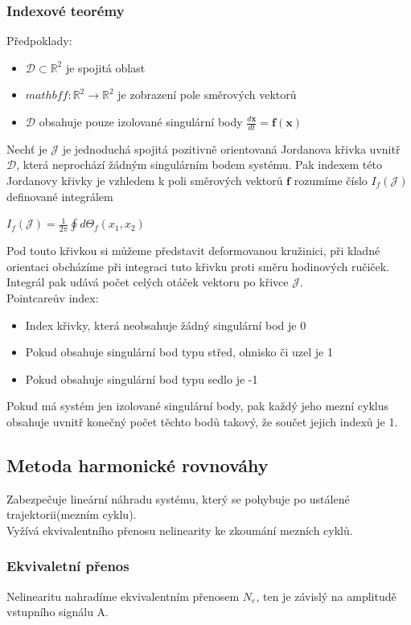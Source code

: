 \subsubsection*{Indexové teorémy}
Předpoklady:
\begin{itemize}
    \item \(\mathcal{D} \subset \mathbb{R}^2 \) je spojitá oblast
    \item \(mathbf{f}: \mathbb{R}^2 \rightarrow \mathbb{R}^2\) je zobrazení pole směrových vektorů
    \item \(\mathcal{D}\) obsahuje pouze izolované singulární body \(\frac{d\mathbf{x}}{dt} = \mathbf{f}(\mathbf{x})\)
\end{itemize}
Nechť je \(\mathcal{J}\) je jednoduchá spojitá pozitivně orientovaná Jordanova křivka uvnitř \(\mathcal{D}\), která neprochází žádným singulárním bodem systému. Pak indexem této Jordanovy křivky je vzhledem k poli směrových vektorů \(\mathbf{f}\) rozumíme číslo \(I_f(\mathcal{J})\) definované integrálem
\begin{center}
    \(I_f(\mathcal{J}) = \frac{1}{2\pi} \oint d\Theta_f(x_1,x_2)\)
\end{center}
Pod touto křivkou si můžeme představit deformovanou kružinici, při kladné orientaci obcházíme při integraci tuto křivku proti směru hodinových ručiček. Integrál pak udává počet celých otáček vektoru po křivce  \(\mathcal{J}\).\\
Pointcareův index:
\begin{itemize}
    \item Index křivky, která neobsahuje žádný singulární bod je 0
    \item Pokud obsahuje singulární bod typu střed, ohnisko či uzel je 1
    \item Pokud obsahuje singulární bod typu sedlo je -1
\end{itemize}
Pokud má systém jen izolované singulární body, pak každý jeho mezní cyklus obsahuje uvnitř konečný počet těchto bodů takový, že součet jejich indexů je 1.\\
\subsection{Metoda harmonické rovnováhy}
Zabezpečuje lineární náhradu systému, který se pohybuje po ustálené trajektorii(mezním cyklu).\\
Vyžívá ekvivalentního přenosu nelinearity ke zkoumání mezních cyklů.

\subsubsection*{Ekvivaletní přenos}
Nelinearitu nahradíme ekvivalentním přenosem $N_e$, ten je závislý na amplitudě vstupního signálu A.

